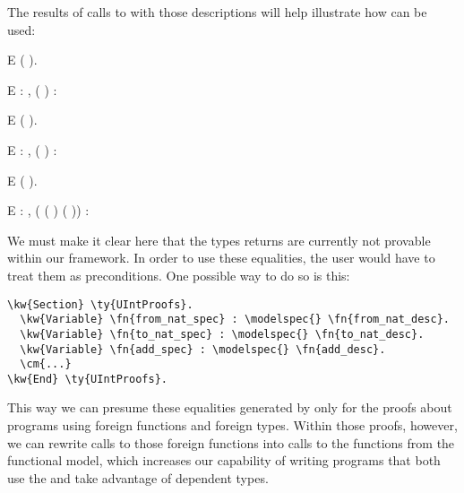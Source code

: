 The results of calls to \modelspec{} with those descriptions will help illustrate how \modelspec{} can be used:

\vspace{.2in}
\begin{SaveVerbatim}{E}
   (\modelspec{} \fromnatdesc{}).
\end{SaveVerbatim}

\begin{SaveVerbatim}{E}
  : , 
    \ty{=}  ( )
  : 
\end{SaveVerbatim}

\vspace{.1in}
\begin{SaveVerbatim}{E}
   (\modelspec{} \tonatdesc{}).
\end{SaveVerbatim}

\begin{SaveVerbatim}{E}
  : , 
    \ty{=}  ( )
  : 
\end{SaveVerbatim}


\vspace{.1in}
\begin{SaveVerbatim}{E}
   (\modelspec{} \adddesc{}).
\end{SaveVerbatim}

\begin{SaveVerbatim}{E}
   : , 
     \ty{=}  ( ( ) ( ))
  : 
\end{SaveVerbatim}

\newpage
We must make it clear here that the types \modelspec{} returns are currently not provable within our framework. In order to use these equalities, the user would have to treat them as preconditions. One possible way to do so is this:

\begin{Verbatim}
\kw{Section} \ty{UIntProofs}.
  \kw{Variable} \fn{from_nat_spec} : \modelspec{} \fn{from_nat_desc}.
  \kw{Variable} \fn{to_nat_spec} : \modelspec{} \fn{to_nat_desc}.
  \kw{Variable} \fn{add_spec} : \modelspec{} \fn{add_desc}.
  \cm{...}
\kw{End} \ty{UIntProofs}.
\end{Verbatim}

This way we can presume these equalities generated by \modelspec{} only for the proofs about programs using \gls{foreign function}s and \gls{foreign type}s. Within those proofs, however, we can rewrite calls to those \gls{foreign function}s into calls to the functions from the \gls{functional model}, which increases our capability of writing programs that both use the \FFI{} and take advantage of dependent types.